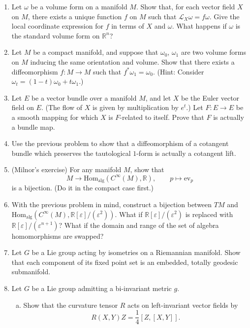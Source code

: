 \documentclass[11pt]{article} %
\begin{document}
\begin{enumerate}
	\item Let $\omega$ be a volume form on a manifold $M$. Show that, for each vector field $X$ on $M$, there exists a unique function $f$ on $M$ such that $\mathcal{L}_X\omega = f\omega$. Give the local coordinate expression for $f$ in terms of $X$ and $\omega$. What happens if $\omega$ is the standard volume form on $\mathbb{R}^n$? 

	\item Let $M$ be a compact manifold, and suppose that $\omega_0$, $\omega_1$ are two volume forms on $M$ inducing the same orientation and volume. Show that there exists a diffeomorphism $f\colon M \to M$ such that $f^*\omega_1 = \omega_0$. (Hint: Consider $\omega_t = (1 - t)\omega_0 + t\omega_1$.) 

	\item Let $E$ be a vector bundle over a manifold $M$, and let $X$ be the Euler vector field on $E$. (The flow of $X$ is given by multiplication by $e^t$.) Let $F\colon E \to E$ be a smooth mapping for which $X$ is $F$-related to itself. Prove that $F$ is actually a bundle map. 

	\item Use the previous problem to show that a diffeomorphism of a cotangent bundle which preserves the tautological $1$-form is actually a cotangent lift.

	\item (Milnor's exercise) For any manifold $M$, show that 
	\[
		M \to \mathrm{Hom}_{\mathrm{alg}}(C^\infty(M), \mathbb{R}), \qquad p \mapsto \mathrm{ev}_p
	\]
	is a bijection. (Do it in the compact case first.)

	\item With the previous problem in mind, construct a bijection between $TM$ and $\mathrm{Hom}_{\mathrm{alg}}(C^\infty(M), \mathbb{R}[\varepsilon]/(\varepsilon^2))$. What if $\mathbb{R}[\varepsilon]/(\varepsilon^2)$ is replaced with $\mathbb{R}[\varepsilon]/(\varepsilon^{n+1})$? What if the domain and range of the set of algebra homomorphisms are swapped?

	\item Let $G$ be a Lie group acting by isometries on a Riemannian manifold. Show that each component of its fixed point set is an embedded, totally geodesic submanifold.

	\item Let $G$ be a Lie group admitting a bi-invariant metric $g$. 
	\begin{enumerate}[(a)]
		\item Show that the curvature tensor $R$ acts on left-invariant vector fields by 
		\[
			R(X, Y)Z = \frac{1}{4}[Z,[X,Y]].
		\]


\end{enumerate}
\end{enumerate}
\end{document}
